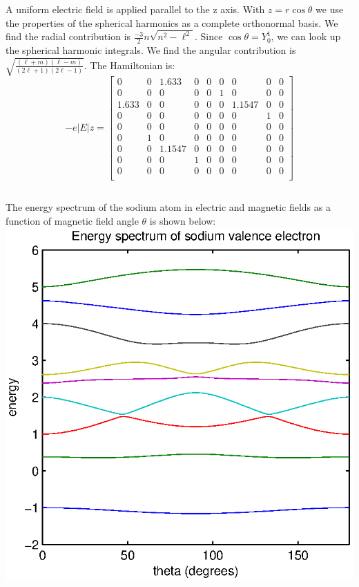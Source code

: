 \documentclass[a4paper,12pt]{article}
\numberwithin{equation}{section}
\begin{document}
\\
\subsection{}
A uniform electric field is applied parallel to the z axis.
With $z=r\cos\theta$ we use the properties of the spherical harmonics as a complete orthonormal basis.
We find the radial contribution is $\frac{-3}{2}n\sqrt{n^2-\ell^2}$. 
Since $\cos\theta=Y_0^1$, we can look up the spherical harmonic integrals.
We find the angular contribution is $\sqrt{\frac{(\ell+m)(\ell-m)}{(2\ell+1)(2\ell-1)}}$.
The Hamiltonian is:
\begin{equation}
-e|E|z=
\begin{bmatrix}
 0 & 0 & 1.633 & 0 & 0 & 0 & 0 & 0 & 0 \\
 0 & 0 & 0 & 0 & 0 & 1 & 0 & 0 & 0 \\
 1.633 & 0 & 0 & 0 & 0 & 0 & 1.1547 & 0 & 0 \\
 0 & 0 & 0 & 0 & 0 & 0 & 0 & 1 & 0 \\
 0 & 0 & 0 & 0 & 0 & 0 & 0 & 0 & 0 \\
 0 & 1 & 0 & 0 & 0 & 0 & 0 & 0 & 0 \\
 0 & 0 & 1.1547 & 0 & 0 & 0 & 0 & 0 & 0 \\
 0 & 0 & 0 & 1 & 0 & 0 & 0 & 0 & 0 \\
 0 & 0 & 0 & 0 & 0 & 0 & 0 & 0 & 0 \\
\end{bmatrix}
\end{equation}

\subsection{}
The energy spectrum of the sodium atom in electric and magnetic fields as a function of magnetic field angle $\theta$ is shown below:\\
\includegraphics{Na_spectrum}
\\
\end{document}
